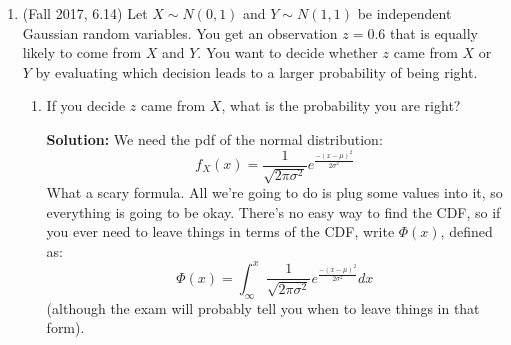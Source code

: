 \documentclass{article}
\newenvironment{solution}{

            \color{blue} \smallskip \textbf{Solution:}}{}
\begin{document}
\begin{enumerate}
\begin{solution}
            I will be the first to admit that these simple 5 equalities could actually be really hard to do in a final environment (I certainly choked trying to do it in class). There, it's always a good idea
            to follow your nose and intuition, make guesses! If it takes you too long, give some semi-reasonable answer and move on to another problem. It's almost certainly worth it to move on than wrestle with algebra,
            and CS 70 is definitely not a class about wrestling with algebra anyways.
        \end{solution}
        \item (Fall 2017, 6.14) Let $X \sim N(0, 1)$ and $Y \sim N(1, 1)$ be independent Gaussian random variables. You get an observation $z = 0.6$ that is equally likely to come from $X$ and $Y$. You want to decide whether $z$ came from $X$ or $Y$ by evaluating which decision
        leads to a larger probability of being right.
        \begin{enumerate}
            \item If you decide $z$ came from $X$, what is the probability you are right?
            \begin{solution}
                We need the pdf of the normal distribution: \[
                    f_X(x) = \frac{1}{\sqrt{2 \pi \sigma^2}} e^{\frac{-(x - \mu)^2}{2 \sigma^2}}
                \]
                What a scary formula. All we're going to do is plug some values into it, so everything is going to be okay. There's no easy way to find the CDF, so if you ever need to leave things in terms of the CDF, write $\Phi(x)$, defined as: \[
                    \Phi(x) = \int_{\infty}^x \frac{1}{\sqrt{2 \pi \sigma^2}} e^{\frac{-(x - \mu)^2}{2 \sigma^2}} dx
                \] (although the exam will probably tell you when to leave things
                in that form).


\end{solution}
\end{enumerate}
\end{enumerate}
\end{document}
